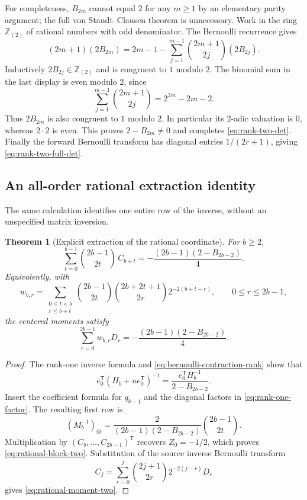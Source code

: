 \documentclass[11pt,a4paper]{article}
\numberwithin{equation}{section}
\theoremstyle{plain}
\newtheorem{theorem}{Theorem}[section]
\theoremstyle{definition}
\theoremstyle{remark}
\begin{document}
For completeness, $B_{2m}$ cannot equal $2$ for any $m\geq1$ by an
elementary parity argument; the full von Staudt--Clausen theorem is
unnecessary.  Work in the ring $\mathbb Z_{(2)}$ of rational numbers
with odd denominator.  The Bernoulli recurrence gives
\[
 (2m+1)(2B_{2m})
 =2m-1-\sum_{j=1}^{m-1}\binom{2m+1}{2j}(2B_{2j}).
\]
Inductively $2B_{2j}\in\mathbb Z_{(2)}$ and is congruent to $1$
modulo $2$.  The binomial sum in the last display is even modulo
$2$, since
\[
 \sum_{j=1}^{m-1}\binom{2m+1}{2j}
 =2^{2m}-2m-2.
\]
Thus $2B_{2m}$ is also congruent to $1$ modulo $2$.  In particular
its $2$-adic valuation is $0$, whereas $2\cdot2$ is even.
This proves $2-B_{2m}\ne0$ and completes
\eqref{eq:rank-two-det}.  Finally the forward Bernoulli transform
has diagonal entries $1/(2r+1)$, giving
\eqref{eq:rank-two-full-det}.

\subsection{An all-order rational extraction identity}

The same calculation identifies one entire row of the inverse,
without an unspecified matrix inversion.

\begin{theorem}[Explicit extraction of the rational coordinate]
\label{thm:rational-row-two}
For $b\geq2$,
\begin{equation}\label{eq:rational-block-two}
 \sum_{t=0}^{b-1}\binom{2b-1}{2t}\,C_{b+t}
 =-\frac{(2b-1)(2-B_{2b-2})}{4}.
\end{equation}
Equivalently, with
\begin{equation}\label{eq:moment-weights-two}
 w_{b,r}=\sum_{\substack{0\leq t<b\\r\leq b+t}}
 \binom{2b-1}{2t}\binom{2b+2t+1}{2r}
       2^{-2(b+t-r)},\qquad 0\leq r\leq2b-1,
\end{equation}
the centered moments satisfy
\begin{equation}\label{eq:rational-moment-two}
 \sum_{r=0}^{2b-1}w_{b,r}D_r
 =-\frac{(2b-1)(2-B_{2b-2})}{4}.
\end{equation}
\end{theorem}

\begin{proof}
The rank-one inverse formula and
\eqref{eq:bernoulli-contraction-rank} show that
\[
 e_0^{\mathsf T}(H_b+u e_0^{\mathsf T})^{-1}
 =\frac{e_0^{\mathsf T}H_b^{-1}}{2-B_{2b-2}}.
\]
Insert the coefficient formula for $q_{b-1}$ and the diagonal
factors in \eqref{eq:rank-one-factor}.  The resulting first row is
\begin{equation}\label{eq:inverse-first-row-two}
 (M_b^{-1})_{0t}=
 \frac{2}{(2b-1)(2-B_{2b-2})}\binom{2b-1}{2t}.
\end{equation}
Multiplication by $(C_b,\ldots,C_{2b-1})^{\mathsf T}$ recovers
$Z_0=-1/2$, which proves \eqref{eq:rational-block-two}.
Substitution of the source inverse Bernoulli transform
\[
 C_j=\sum_{r=0}^j\binom{2j+1}{2r}2^{-2(j-r)}D_r
\]
gives \eqref{eq:rational-moment-two}.
\end{proof}
\end{document}
